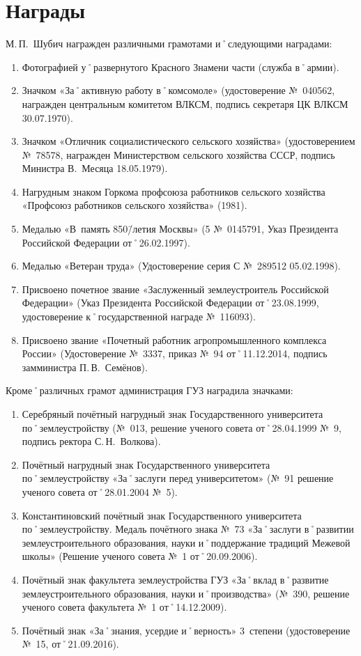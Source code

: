 ﻿\section{Награды}
\noindent М.\,П.~Шубич награжден различными грамотами и˚следующими наградами: 

\begin{enumerate}[nosep]
	\item Фотографией у˚развернутого Красного Знамени части (служба в˚армии).
	\item Значком «За˚активную работу в˚комсомоле» (удостоверение №~040562, награжден центральным комитетом ВЛКСМ, подпись секретаря ЦК ВЛКСМ 30.07.1970).
	\item Значком «Отличник социалистического сельского хозяйства» (удостоверением №~78578, награжден Министерством сельского хозяйства СССР, подпись Министра В.~Месяца 18.05.1979).
	\item Нагрудным знаком Горкома профсоюза работников сельского хозяйства «Профсоюз работников сельского хозяйства» (1981).
	\item Медалью «В~память 850\=/летия Москвы» (5 №~0145791, Указ Президента Российской Федерации от˚26.02.1997).
	\item Медалью «Ветеран труда» (Удостоверение серия С №~289512 05.02.1998).
	\item Присвоено почетное звание «Заслуженный землеустроитель Российской Федерации» (Указ Президента Российской Федерации от˚23.08.1999, удостоверение к˚государственной награде №~116093).
	\item Присвоено звание «Почетный работник агропромышленного комплекса России» (Удостоверение №~3337, приказ №~94 от˚11.12.2014, подпись замминистра П.\,В.~Семёнов).
\end{enumerate}

\noindent Кроме˚различных грамот администрация ГУЗ наградила значками:
\begin{enumerate}[nosep]
	\item Серебряный почётный нагрудный знак Государственного университета по˚землеустройству (№~013, решение ученого совета от˚28.04.1999 №~9, подпись ректора С.\,Н.~Волкова).
	\item Почётный нагрудный знак Государственного университета по˚землеустройству «За˚заслуги перед университетом» (№~91 решение ученого совета от˚28.01.2004 №~5).
	\item Константиновский почётный знак Государственного университета по˚землеустройству. Медаль почётного знака №~73 «За˚заслуги в˚развитии землеустроительного образования, науки и˚поддержание традиций Межевой школы» (Решение ученого совета №~1 от˚20.09.2006).
	\item Почётный знак факультета землеустройства ГУЗ «За˚вклад в˚развитие землеустроительного образования, науки и˚производства» (№~390, решение ученого совета факультета №~1 от˚14.12.2009).
	\item Почётный знак «За˚знания, усердие и˚верность» 3~степени (удостоверение №~15, от˚21.09.2016). 
\end{enumerate}
